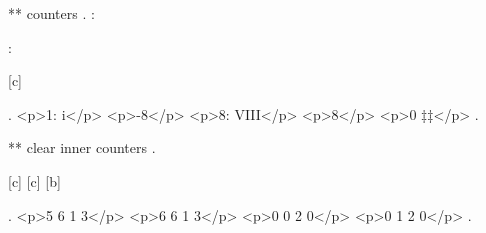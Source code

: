 ** counters
.
\thec: 

\addtocounter{c}{3 * -(2+1)}    %

\thec: 

\the\value{c}

[c]
\setcounter{a}{\value{c}}

.
<p>1: i</p>
<p>-8</p>
<p>8: VIII</p>
<p>8</p>
<p>0 ‡‡</p>
.


** clear inner counters
.

[c]	%
[c]
[b]

\setcounter{a}{5}
\setcounter{b}{6}
\setcounter{d}{3}




.
<p>5 6 1 3</p>
<p>6 6 1 3</p>
<p>0 0 2 0</p>
<p>0 1 2 0</p>
.